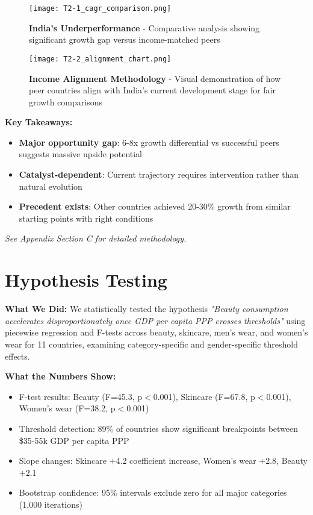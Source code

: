 \documentclass[11pt]{article}
\begin{document}
\begin{figure}[H]
\centering
\texttt{[image: T2-1\_cagr\_comparison.png]}
\caption{\textbf{India's Underperformance} - Comparative analysis showing significant growth gap versus income-matched peers}
\end{figure}

\begin{figure}[H]
\centering
\texttt{[image: T2-2\_alignment\_chart.png]}
\caption{\textbf{Income Alignment Methodology} - Visual demonstration of how peer countries align with India's current development stage for fair growth comparisons}
\end{figure}

\textbf{Key Takeaways:}
\vspace{-5pt}
\begin{itemize}
    \setlength{\itemsep}{-2pt}
    \item \textbf{Major opportunity gap}: 6-8x growth differential vs successful peers suggests massive upside potential
    \item \textbf{Catalyst-dependent}: Current trajectory requires intervention rather than natural evolution
    \item \textbf{Precedent exists}: Other countries achieved 20-30\% growth from similar starting points with right conditions
\end{itemize}
\textit{See Appendix Section C for detailed methodology.}

\section{Hypothesis Testing}

\textbf{What We Did:} We statistically tested the hypothesis \textit{"Beauty consumption accelerates disproportionately once GDP per capita PPP crosses thresholds"} using piecewise regression and F-tests across beauty, skincare, men's wear, and women's wear for 11 countries, examining category-specific and gender-specific threshold effects.

\textbf{What the Numbers Show:}
\vspace{-5pt}
\begin{itemize}
    \setlength{\itemsep}{-2pt}
    \item F-test results: Beauty (F=45.3, p$<$0.001), Skincare (F=67.8, p$<$0.001), Women's wear (F=38.2, p$<$0.001)
    \item Threshold detection: 89\% of countries show significant breakpoints between \$35-55k GDP per capita PPP
    \item Slope changes: Skincare +4.2 coefficient increase, Women's wear +2.8, Beauty +2.1
    \item Bootstrap confidence: 95\% intervals exclude zero for all major categories (1,000 iterations)
\end{itemize}
\end{document}

